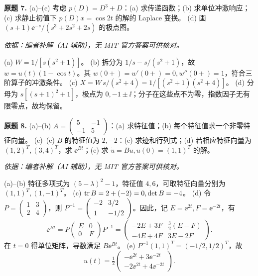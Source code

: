 \begin{exercise}\label{cw:final-7}\textbf{原题 7.}
(a)--(c) 考虑 $p(D)=D^3+D$：(a) 求传递函数；(b) 求单位冲激响应；(c) 求静止初值下 $p(D)x=\cos2t$ 的解的 Laplace 变换。
(d) 画 $(s+1)\ee^{-s}/(s^3+2s^2+2s)$ 的极点图。
\end{exercise}
\begin{solution}
\textit{依据：编者补解（AI 辅助），无 MIT 官方答案可供核对。}\par
(a) $W=1/[s(s^2+1)]$。
(b) 拆分为 $1/s-s/(s^2+1)$，故 $w=u(t)(1-\cos t)$。其 $w(0+)=w'(0+)=0,w''(0+)=1$，符合三阶算子的冲激条件。
(c) $X=W\,s/(s^2+4)=1/[(s^2+1)(s^2+4)]$。
(d) 分母为 $s[(s+1)^2+1]$，极点为 $0,-1\pm\ii$；分子在这些点不为零，指数因子无有限零点，故均保留。
\end{solution}
\begin{exercise}\label{cw:final-8}\textbf{原题 8.}
(a)--(b) $A=\begin{pmatrix}5&-1\\-1&5\end{pmatrix}$：(a) 求特征值；(b) 每个特征值求一个非零特征向量。
(c)--(e) $B$ 的特征值为 $2,-2$：(c) 求迹和行列式；(d) 若相应特征向量为 $(1,2)^T,(3,4)^T$，求 $\ee^{Bt}$；(e) 求 $\dot u=Bu,u(0)=(1,1)^T$ 的解。
\end{exercise}
\begin{solution}
\textit{依据：编者补解（AI 辅助），无 MIT 官方答案可供核对。}\par
(a)--(b) 特征多项式为 $(5-\lambda)^2-1$，特征值 $4,6$，可取特征向量分别为 $(1,1)^T,(1,-1)^T$。
(c) $\operatorname{tr} B=2+(-2)=0,\det B=-4$。
(d) 令 $P=\begin{pmatrix}1&3\\2&4\end{pmatrix}$，则 $P^{-1}=\begin{pmatrix}-2&3/2\\1&-1/2\end{pmatrix}$。因此，记 $E=\ee^{2t},F=\ee^{-2t}$，有
\[\ee^{Bt}=P\begin{pmatrix}E&0\\0&F\end{pmatrix}P^{-1}
=\begin{pmatrix}-2E+3F&\tfrac32(E-F)\\-4E+4F&3E-2F\end{pmatrix}.\]
在 $t=0$ 得单位矩阵，导数满足 $B\ee^{Bt}$。
(e) $P^{-1}(1,1)^T=(-1/2,1/2)^T$，故
\[u(t)=\tfrac12\begin{pmatrix}-\ee^{2t}+3\ee^{-2t}\\-2\ee^{2t}+4\ee^{-2t}\end{pmatrix}.\]
\end{solution}
